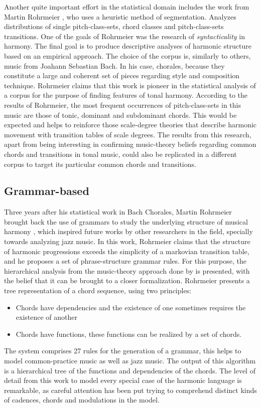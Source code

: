     Another quite important effort in the statistical domain includes the work from Martin Rohrmeier \cite{rohrmeier2008statistical}, who uses a heuristic method of segmentation. Analyzes distributions of single pitch-class-sets, chord classes and pitch-class-sets transitions. One of the goals of Rohrmeier was the research of \emph{syntacticality} in harmony. The final goal is to produce descriptive analyses of harmonic structure based on an empirical approach. The choice of the corpus is, similarly to others, music from Joahann Sebastian Bach. In his case, chorales, because they constitute a large and coherent set of pieces regarding style and composition technique. Rohrmeier claims that this work is pioneer in the statistical analysis of a corpus for the purpose of finding features of tonal harmony. According to the results of Rohrmeier, the most frequent occurrences of pitch-class-sets in this music are those of tonic, dominant and subdominant chords. This would be expected and helps to reinforce those scale-degree theories that describe harmonic movement with transition tables of scale degrees. The results from this research, apart from being interesting in confirming music-theory beliefs regarding common chords and transitions in tonal music, could also be replicated in a different corpus to target its particular common chords and transitions.

    \subsection{Grammar-based}
    Three years after his statistical work in Bach Chorales, Martin Rohrmeier brought back the use of grammars to study the underlying structure of musical harmony \cite{rohrmeier2011towards}, which inspired future works by other researchers in the field, specially towards analyzing jazz music. In this work, Rohrmeier claims that the structure of harmonic progressions exceeds the simplicity of a markovian transition table, and he proposes a set of phrase-structure grammar rules. For this purpose, the hierarchical analysis from the music-theory approach done by \cite{kostka1995tonal} is presented, with the belief that it can be brought to a closer formalization. Rohrmeier presents a tree representation of a chord sequence, using two principles:
    \begin{itemize}
			\item Chords have dependencies and the existence of one sometimes requires the existence of another
			\item Chords have functions, these functions can be realized by a set of chords.
		\end{itemize}
    The system comprises 27 rules for the generation of a grammar, this helps to model common-practice music as well as jazz music. The output of this algorithm is a hierarchical tree of the functions and dependencies of the chords. The level of detail from this work to model every special case of the harmonic language is remarkable, as careful attention has been put trying to comprehend distinct kinds of cadences, chords and modulations in the model.

